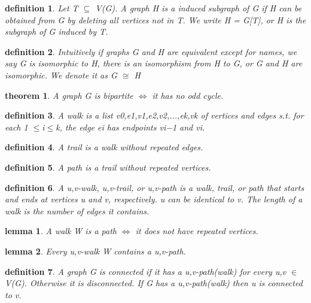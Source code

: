 \documentclass[twocolumn]{article}
\newtheorem{theorem}{theorem}[section]  %
\newtheorem{definition}{definition}
\newtheorem{lemma}{lemma}
\begin{document}
\begin{CJK*}{UTF8}{bkai}
    \begin{definition}
        Let T $\subseteq$ V(G). A graph H is a induced subgraph of G if H can be obtained
 from G by deleting all vertices not in T. We write H = G[T], or H is the
 subgraph of G induced by T.       
    \end{definition}

    \begin{definition}
         Intuitively if graphs G and H are equivalent except for names, we say G is
 isomorphic to H, there is an isomorphism from H to G, or G and H are
 isomorphic. We denote it as G $\cong$ H
    \end{definition}

    \begin{theorem}
        A graph G is bipartite $\iff$ it has no odd cycle.
    \end{theorem}

    \begin{definition}
        A walk is a list v0,e1,v1,e2,v2,...,ek,vk of vertices and edges s.t. for each
 1 $\leq$i$\leq$k, the edge ei has endpoints vi−1 and vi.
    \end{definition}

    \begin{definition}
        A trail is a walk without repeated edges.
    \end{definition}

    \begin{definition}
         A path is a trail without repeated vertices.
    \end{definition}

    \begin{definition}
         A u,v-walk, u,v-trail, or u,v-path is a walk, trail, or path that starts and ends
 at vertices u and v, respectively. u can be identical to v. The length of a walk
 is the number of edges it contains.
    \end{definition}

    \begin{lemma}
        A walk W is a path $\iff$ it does not have repeated vertices.
    \end{lemma}


    \begin{lemma}
        Every u,v-walk W contains a u,v-path.
    \end{lemma}

    \begin{definition}
         A graph G is connected if it has a u,v-path(walk) for every u,v $\in$ V(G).
 Otherwise it is disconnected. If G has a u,v-path(walk) then u is connected to
 v.
    \end{definition}


\end{CJK*}
\end{document}
